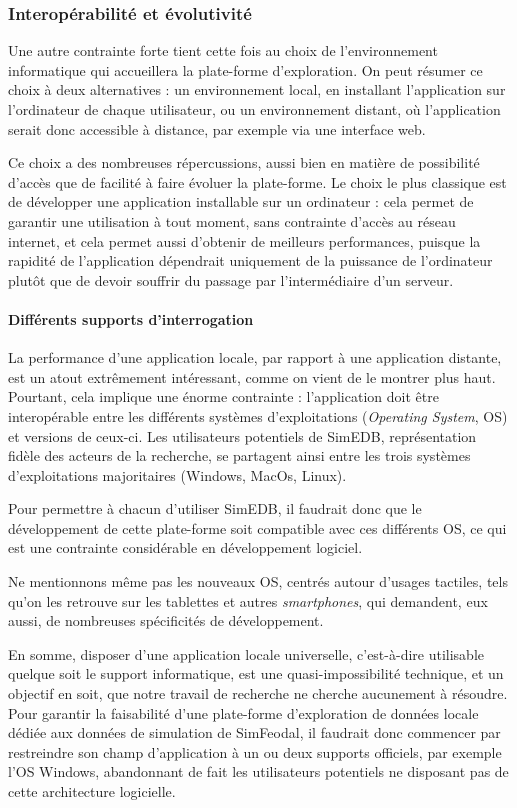 \subsubsection{Interopérabilité et évolutivité}

Une autre contrainte forte tient cette fois au choix de l'environnement informatique qui accueillera la plate-forme d'exploration.
On peut résumer ce choix à deux alternatives : un environnement local, en installant l'application sur l'ordinateur de chaque utilisateur, ou un environnement distant, où l'application serait donc accessible à distance, par exemple via une interface web.

Ce choix a des nombreuses répercussions, aussi bien en matière de possibilité d'accès que de facilité à faire évoluer la plate-forme.
Le choix le plus classique est de développer une application installable sur un ordinateur : cela permet de garantir une utilisation à tout moment, sans contrainte d'accès au réseau internet, et cela permet aussi d'obtenir de meilleurs performances, puisque la rapidité de l'application dépendrait uniquement de la puissance de l'ordinateur plutôt que de devoir souffrir du passage par l'intermédiaire d'un serveur.

\paragraph*{Différents supports d'interrogation}
La performance d'une application locale, par rapport à une application distante, est un atout extrêmement intéressant, comme on vient de le montrer plus haut.
Pourtant, cela implique une énorme contrainte : l'application doit être interopérable entre les différents systèmes d'exploitations (\textit{Operating System}, OS) et versions de ceux-ci.
Les utilisateurs potentiels de SimEDB, représentation fidèle des acteurs de la recherche, se partagent ainsi entre les trois systèmes d'exploitations majoritaires (Windows, MacOs, Linux).

Pour permettre à chacun d'utiliser SimEDB, il faudrait donc que le développement de cette plate-forme soit compatible avec ces différents OS, ce qui est une contrainte considérable en développement logiciel.

Ne mentionnons même pas les nouveaux OS, centrés autour d'usages tactiles, tels qu'on les retrouve sur les tablettes et autres \textit{smartphones}, qui demandent, eux aussi, de nombreuses spécificités de développement.

En somme, disposer d'une application locale universelle, c'est-à-dire utilisable quelque soit le support informatique, est une quasi-impossibilité technique, et un objectif en soit, que notre travail de recherche ne cherche aucunement à résoudre.
Pour garantir la faisabilité d'une plate-forme d'exploration de données locale dédiée aux données de simulation de SimFeodal, il faudrait donc commencer par restreindre son champ d'application à un ou deux supports officiels, par exemple l'OS Windows, abandonnant de fait les utilisateurs potentiels ne disposant pas de cette architecture logicielle.

